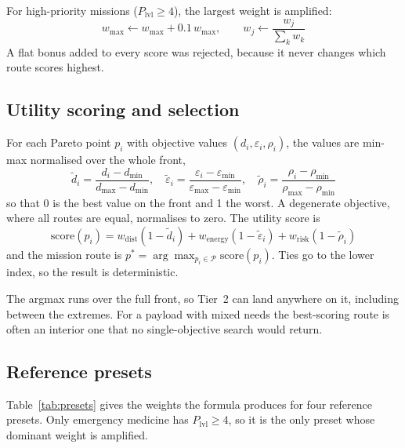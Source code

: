 For high-priority missions ($P_\mathrm{lvl} \geq 4$), the largest weight is amplified:
\begin{equation}
  w_\mathrm{max} \leftarrow w_\mathrm{max} + 0.1\,w_\mathrm{max}, \qquad
  w_j \leftarrow \frac{w_j}{\sum_k w_k} \label{eq:amplify}
\end{equation}
A flat bonus added to every score was rejected, because it never changes which route
scores highest.

\subsection{Utility scoring and selection}

For each Pareto point $p_i$ with objective values $(d_i, \varepsilon_i, \rho_i)$, the
values are min-max normalised over the whole front,
\begin{equation}
  \tilde{d}_i = \frac{d_i - d_{\min}}{d_{\max} - d_{\min}}, \quad
  \tilde{\varepsilon}_i = \frac{\varepsilon_i - \varepsilon_{\min}}{\varepsilon_{\max} - \varepsilon_{\min}}, \quad
  \tilde{\rho}_i = \frac{\rho_i - \rho_{\min}}{\rho_{\max} - \rho_{\min}}
\end{equation}
so that 0 is the best value on the front and 1 the worst. A degenerate objective, where
all routes are equal, normalises to zero. The utility score is
\begin{equation}
  \mathrm{score}(p_i) = w_\mathrm{dist}(1 - \tilde{d}_i) + w_\mathrm{energy}(1 - \tilde{\varepsilon}_i) + w_\mathrm{risk}(1 - \tilde{\rho}_i) \label{eq:score}
\end{equation}
and the mission route is $p^* = \arg\max_{p_i \in \mathcal{P}} \mathrm{score}(p_i)$.
Ties go to the lower index, so the result is deterministic.

The argmax runs over the full front, so Tier~2 can land anywhere on it, including
between the extremes. For a payload with mixed needs the best-scoring
route is often an interior one that no single-objective search would return.

\subsection{Reference presets}

Table~\ref{tab:presets} gives the weights the formula produces for four reference
presets. Only emergency medicine has $P_\mathrm{lvl} \geq 4$, so it is the only preset
whose dominant weight is amplified.

